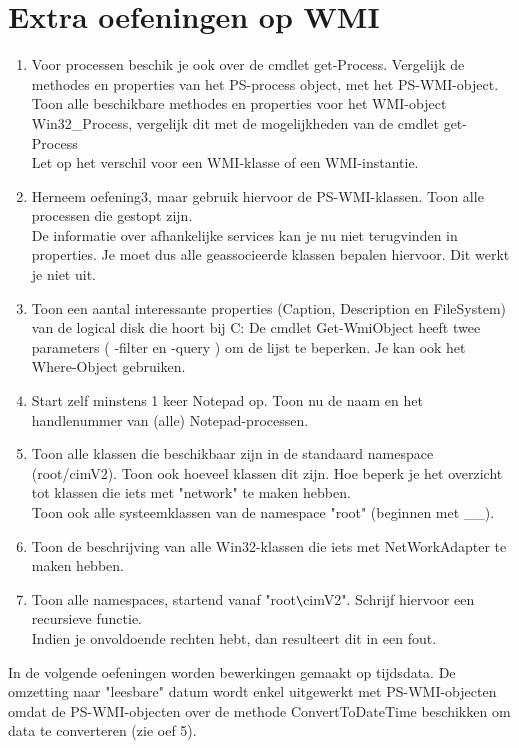 \documentclass[11pt,a4paper]{report}
\begin{document}
\section{Extra oefeningen op WMI}
\begin{enumerate}[resume]
	\item Voor processen beschik je ook over de cmdlet get-Process. Vergelijk de methodes en properties van het PS-process object, met het PS-WMI-object. Toon alle beschikbare methodes en properties voor het WMI-object Win32\_Process, vergelijk dit met de mogelijkheden van de cmdlet get-Process
	\\Let op het verschil voor een WMI-klasse of een WMI-instantie.
	\item Herneem oefening3, maar gebruik hiervoor de PS-WMI-klassen. Toon alle processen die gestopt zijn.
	\\ De informatie over afhankelijke services kan je nu niet terugvinden in properties. Je moet dus alle geassocieerde klassen bepalen hiervoor. Dit werkt je niet uit.
	\item Toon een aantal interessante properties (Caption, Description en FileSystem) van de logical disk die hoort bij C:
	De cmdlet Get-WmiObject heeft twee parameters ( -filter en -query ) om de lijst te beperken. Je kan ook het Where-Object gebruiken.
	\item Start zelf minstens 1 keer Notepad op. Toon nu de naam en het handlenummer van (alle) Notepad-processen.
	\item Toon alle klassen die beschikbaar zijn in de standaard namespace (root/cimV2). Toon ook hoeveel klassen dit zijn.
	Hoe beperk je het overzicht tot klassen die iets met "network" te maken hebben.
	\\ Toon ook alle systeemklassen van de namespace "root" (beginnen met \_\_).
	\item Toon de beschrijving van alle Win32-klassen die iets met NetWorkAdapter te maken hebben.
	\item Toon alle namespaces, startend vanaf "root\verb+\+cimV2". Schrijf hiervoor een recursieve functie.
	\\Indien je onvoldoende rechten hebt, dan resulteert dit in een fout.
\end{enumerate}
In de volgende oefeningen worden bewerkingen gemaakt op tijdsdata. De omzetting naar "leesbare" datum wordt enkel uitgewerkt met PS-WMI-objecten omdat de PS-WMI-objecten over de methode ConvertToDateTime beschikken om data te converteren (zie oef 5).
\end{document}
